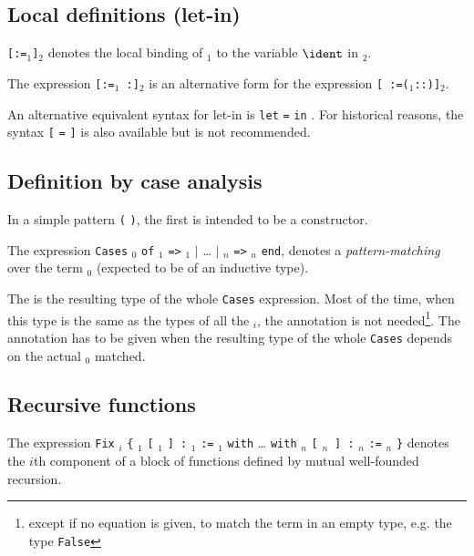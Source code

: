\subsection{Local definitions (let-in)}

{\tt [}{\ident}{\tt :=}{\term$_1$}{\tt ]}{\term$_2$} denotes the local
binding of \term$_1$ to the variable $\ident$ in \term$_2$.

\medskip
\Rem The expression {\tt [}{\ident}{\tt :=}{\term$_1$}{\tt
:}{\type}{\tt ]}{\term$_2$} is an alternative form for the expression {\tt [}{\ident}{\tt
:=(}{\term$_1$}{\tt ::}{\type}{\tt )]}{\term$_2$}.

\Rem An alternative equivalent syntax for let-in is {\tt let} {\ident}
{\tt =} {\term} {\tt in} {\term}.  For historical reasons, the syntax
{\tt [} {\ident} {\tt =} {\term} {\tt ]} {\term} is also available but
is not recommended.

\subsection{Definition by case analysis}

In a simple pattern \verb!(! \nelist{\ident}{} \verb!)!, the first {\ident}
is intended to be a constructor.

The expression {\tt \zeroone{\annotation}} {\tt Cases} {\term$_0$} {\tt of}
{\pattern$_1$} {\tt =>} {\term$_1$} {\tt $|$} {\ldots} {\tt $|$}
{\pattern$_n$} {\tt =>} {\term$_n$} {\tt end}, denotes a
{\em pattern-matching} over the term {\term$_0$} (expected to be of an
inductive type). 

The {\annotation} is the resulting type of the whole {\tt Cases}
expression. Most of the time, when this type is the same as the
types of all the {\term$_i$}, the annotation is not needed\footnote{except
if no equation is given, to match the term in an empty type, e.g. the
type \texttt{False}}. The annotation has to be given when the 
resulting type of the whole {\tt Cases} depends on the actual {\term$_0$}
matched.


\subsection{Recursive functions}

The expression {\tt Fix} {\ident$_i$} \verb.{. \ident$_1$ {\tt [}
\binders$_1$ {\tt ] :} {\type$_1$} \texttt{:=} \term$_1$ 
{\tt with} {\ldots} 
{\tt with} \ident$_n$ {\tt [} \binders$_n$~{\tt{]} :} {\type$_n$}
\texttt{:=} \term$_n$ \verb.}. denotes
the $i$th component of a block of functions defined by mutual
well-founded recursion.

